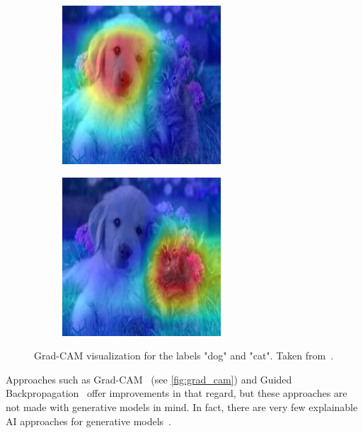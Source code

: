 \begin{figure}[H]
\begin{subfigure}{0.3\linewidth}
        \includegraphics[width=\linewidth]{resources/related_works/gradcam_dog.jpg}
    \end{subfigure}
    \hfill
    \begin{subfigure}{0.3\linewidth}
        \includegraphics[width=\linewidth]{resources/related_works/gradcam_cat.jpg}
    \end{subfigure}
    \caption[Grad-Cam Visualization]{Grad-CAM visualization for the labels "dog" and "cat". Taken from~\textcite{GradCamExample}.}
    \label{fig:grad_cam}
\end{figure}
Approaches such as Grad-CAM~\cite{GradCam} (see \autoref{fig:grad_cam}) and Guided Backpropagation~\cite{guided_backprop} offer improvements in that regard, but these approaches are not made with generative models in mind. In fact, there are very few explainable AI approaches for generative models~\cite{XAI}.
